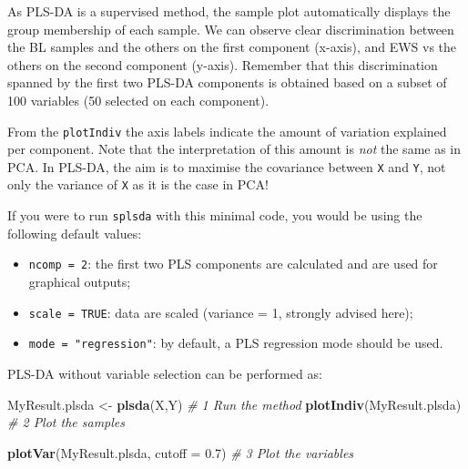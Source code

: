\documentclass[]{book}
\newenvironment{Shaded}{\begin{snugshade}}{\end{snugshade}}
\newcommand{\CommentTok}[1]{\textcolor[rgb]{0.56,0.35,0.01}{\textit{#1}}}
\newcommand{\DataTypeTok}[1]{\textcolor[rgb]{0.13,0.29,0.53}{#1}}
\newcommand{\DecValTok}[1]{\textcolor[rgb]{0.00,0.00,0.81}{#1}}
\newcommand{\FloatTok}[1]{\textcolor[rgb]{0.00,0.00,0.81}{#1}}
\newcommand{\KeywordTok}[1]{\textcolor[rgb]{0.13,0.29,0.53}{\textbf{#1}}}
\newcommand{\NormalTok}[1]{#1}
\newcommand{\OperatorTok}[1]{\textcolor[rgb]{0.81,0.36,0.00}{\textbf{#1}}}
\newcommand{\StringTok}[1]{\textcolor[rgb]{0.31,0.60,0.02}{#1}}
\providecommand{\tightlist}{%
  \setlength{\itemsep}{0pt}\setlength{\parskip}{0pt}}
\begin{document}
\begin{Shaded}
\end{Shaded}

As PLS-DA is a supervised method, the sample plot automatically displays the group membership of each sample. We can observe clear discrimination between the BL samples and the others on the first component (x-axis), and EWS vs the others on the second component (y-axis). Remember that this discrimination spanned by the first two PLS-DA components is obtained based on a subset of 100 variables (50 selected on each component).

From the \texttt{plotIndiv} the axis labels indicate the amount of variation explained per component. Note that the interpretation of this amount is \emph{not} the same as in PCA. In PLS-DA, the aim is to maximise the covariance between \texttt{X} and \texttt{Y}, not only the variance of \texttt{X} as it is the case in PCA!

If you were to run \texttt{splsda} with this minimal code, you would be using the following default values:

\begin{itemize}
\tightlist
\item
  \texttt{ncomp\ =\ 2}: the first two PLS components are calculated and are used for graphical outputs;
\item
  \texttt{scale\ =\ TRUE}: data are scaled (variance = 1, strongly advised here);
\item
  \texttt{mode\ =\ "regression"}: by default, a PLS regression mode should be used.
\end{itemize}

PLS-DA without variable selection can be performed as:

\begin{Shaded}
\begin{Highlighting}[]
\NormalTok{MyResult.plsda <-}\StringTok{ }\KeywordTok{plsda}\NormalTok{(X,Y) }\CommentTok{# 1 Run the method}
\KeywordTok{plotIndiv}\NormalTok{(MyResult.plsda)    }\CommentTok{# 2 Plot the samples}
\end{Highlighting}
\end{Shaded}

\begin{Shaded}
\begin{Highlighting}[]
\KeywordTok{plotVar}\NormalTok{(MyResult.plsda, }\DataTypeTok{cutoff =} \FloatTok{0.7}\NormalTok{)      }\CommentTok{# 3 Plot the variables}
\end{Highlighting}
\end{Shaded}
\end{document}
